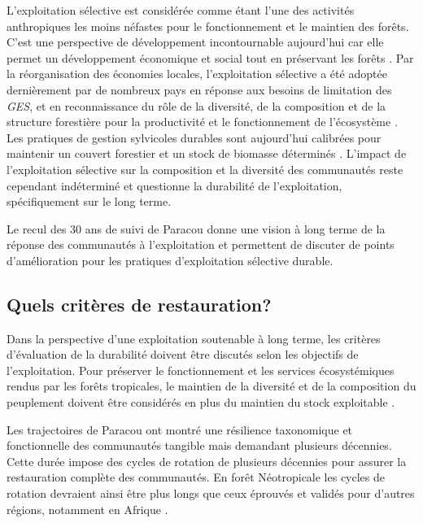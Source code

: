 \documentclass[
  11pt,
  french,
  A4paper,
  extrafontsizes,onecolumn,openright
  ]{memoir}
\begin{document}
L'exploitation sélective est considérée comme étant l'une des activités
anthropiques les moins néfastes pour le fonctionnement et le maintien
des forêts. C'est une perspective de développement incontournable
aujourd'hui car elle permet un développement économique et social tout
en préservant les forêts \autocite{Chaudhary2016}. Par la réorganisation
des économies locales, l'exploitation sélective a été adoptée
dernièrement par de nombreux pays en réponse aux besoins de limitation
des \emph{GES}, et en reconnaissance du rôle de la diversité, de la
composition et de la structure forestière pour la productivité et le
fonctionnement de l'écosystème \autocite{Begon2006}. Les pratiques de
gestion sylvicoles durables sont aujourd'hui calibrées pour maintenir un
couvert forestier et un stock de biomasse déterminés
\autocite{ITTO2005}. L'impact de l'exploitation sélective sur la
composition et la diversité des communautés reste cependant indéterminé
et questionne la durabilité de l'exploitation, spécifiquement sur le
long terme.

Le recul des 30 ans de suivi de Paracou donne une vision à long terme de
la réponse des communautés à l'exploitation et permettent de discuter de
points d'amélioration pour les pratiques d'exploitation sélective
durable.

\subsection{Quels critères de
restauration?}\label{quels-criteres-de-restauration}

Dans la perspective d'une exploitation soutenable à long terme, les
critères d'évaluation de la durabilité doivent être discutés selon les
objectifs de l'exploitation. Pour préserver le fonctionnement et les
services écosystémiques rendus par les forêts tropicales, le maintien de
la diversité et de la composition du peuplement doivent être considérés
en plus du maintien du stock exploitable
\autocites{ITTO2005}{Barlow2018}.

Les trajectoires de Paracou ont montré une résilience taxonomique et
fonctionnelle des communautés tangible mais demandant plusieurs
décennies. Cette durée impose des cycles de rotation de plusieurs
décennies pour assurer la restauration complète des communautés. En
forêt Néotropicale les cycles de rotation devraient ainsi être plus
longs que ceux éprouvés et validés pour d'autres régions, notamment en
Afrique \autocite{Durrieu1998}.
\end{document}
